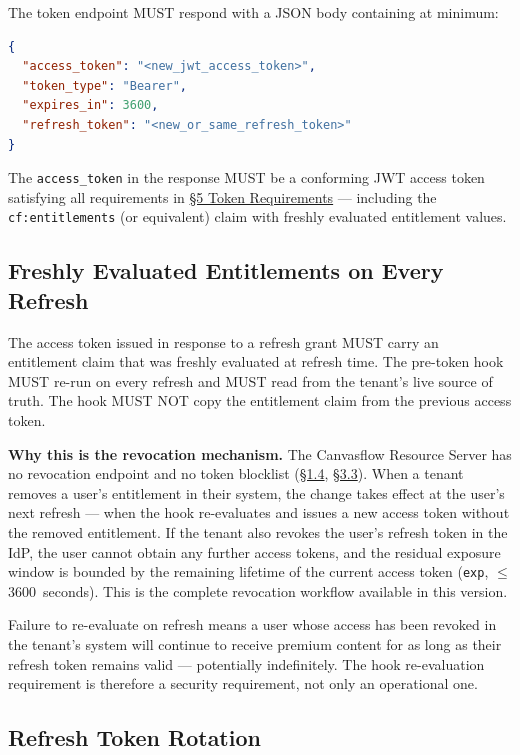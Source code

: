 The token endpoint MUST respond with a JSON body containing at minimum:

\begin{lstlisting}[language=json]
{
  "access_token": "<new_jwt_access_token>",
  "token_type": "Bearer",
  "expires_in": 3600,
  "refresh_token": "<new_or_same_refresh_token>"
}
\end{lstlisting}

The \texttt{access\_token} in the response MUST be a conforming JWT access token
satisfying all requirements in \hyperref[sec:token-requirements]{\S5 Token Requirements} --- including the
\texttt{cf:entitlements} (or equivalent) claim with freshly evaluated entitlement values.

\subsection{Freshly Evaluated Entitlements on Every Refresh}\label{sec:freshly-evaluated-entitlements}

The access token issued in response to a refresh grant MUST carry an entitlement claim
that was freshly evaluated at refresh time. The pre-token hook MUST re-run on every
refresh and MUST read from the tenant's live source of truth. The hook MUST NOT copy the
entitlement claim from the previous access token.

\textbf{Why this is the revocation mechanism.} The Canvasflow Resource Server has no
revocation endpoint and no token blocklist (\hyperref[sec:out-of-scope]{\S1.4}, \hyperref[sec:canvasflow-responsibilities]{\S3.3}). When a tenant removes a
user's entitlement in their system, the change takes effect at the user's next refresh
--- when the hook re-evaluates and issues a new access token without the removed
entitlement. If the tenant also revokes the user's refresh token in the IdP, the user
cannot obtain any further access tokens, and the residual exposure window is bounded by
the remaining lifetime of the current access token (\texttt{exp}, $\leq$ 3600~seconds).
This is the complete revocation workflow available in this version.

Failure to re-evaluate on refresh means a user whose access has been revoked in the
tenant's system will continue to receive premium content for as long as their refresh
token remains valid --- potentially indefinitely. The hook re-evaluation requirement is
therefore a security requirement, not only an operational one.

\subsection{Refresh Token Rotation}

